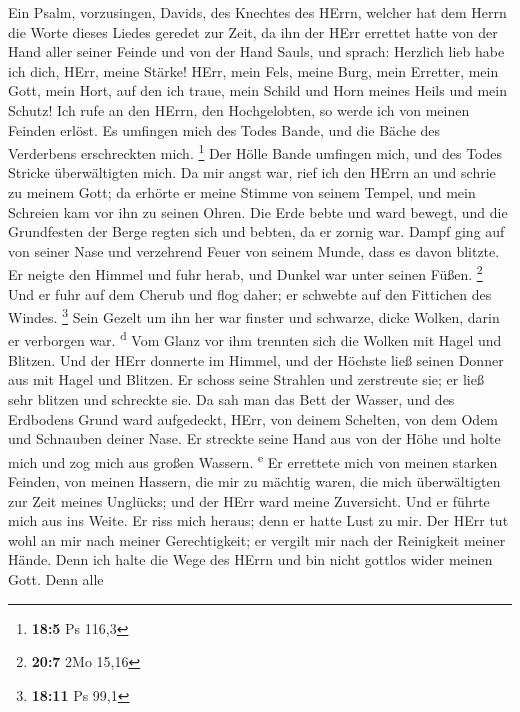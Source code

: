  Ein Psalm, vorzusingen, Davids, des Knechtes des HErrn,
welcher hat dem Herrn die Worte dieses Liedes geredet zur Zeit, da ihn
der HErr errettet hatte von der Hand aller seiner Feinde und von der
Hand Sauls,  und sprach: Herzlich lieb habe ich dich,
HErr, meine Stärke!  HErr, mein Fels, meine Burg, mein
Erretter, mein Gott, mein Hort, auf den ich traue, mein Schild und Horn
meines Heils und mein Schutz!  Ich rufe an den HErrn, den
Hochgelobten, so werde ich von meinen Feinden erlöst.  Es
umfingen mich des Todes Bande, und die Bäche des Verderbens erschreckten
mich. \footnote{\textbf{18:5} Ps 116,3}  Der Hölle Bande
umfingen mich, und des Todes Stricke überwältigten mich. 
Da mir angst war, rief ich den HErrn an und schrie zu meinem Gott; da
erhörte er meine Stimme von seinem Tempel, und mein Schreien kam vor ihn
zu seinen Ohren.  Die Erde bebte und ward bewegt, und die
Grundfesten der Berge regten sich und bebten, da er zornig war.
 Dampf ging auf von seiner Nase und verzehrend Feuer von
seinem Munde, dass es davon blitzte.  Er neigte den
Himmel und fuhr herab, und Dunkel war unter seinen Füßen. \footnote{\textbf{20:7}
  2Mo 15,16}  Und er fuhr auf dem Cherub und flog daher;
er schwebte auf den Fittichen des Windes. \footnote{\textbf{18:11} Ps
  99,1}  Sein Gezelt um ihn her war finster und schwarze,
dicke Wolken, darin er verborgen war. \textsuperscript{d}
 Vom Glanz vor ihm trennten sich die Wolken mit Hagel und
Blitzen.  Und der HErr donnerte im Himmel, und der
Höchste ließ seinen Donner aus mit Hagel und Blitzen.  Er
schoss seine Strahlen und zerstreute sie; er ließ sehr blitzen und
schreckte sie.  Da sah man das Bett der Wasser, und des
Erdbodens Grund ward aufgedeckt, HErr, von deinem Schelten, von dem Odem
und Schnauben deiner Nase.  Er streckte seine Hand aus
von der Höhe und holte mich und zog mich aus großen Wassern.
\textsuperscript{e}  Er errettete mich von meinen starken
Feinden, von meinen Hassern, die mir zu mächtig waren, 
die mich überwältigten zur Zeit meines Unglücks; und der HErr ward meine
Zuversicht.  Und er führte mich aus ins Weite. Er riss
mich heraus; denn er hatte Lust zu mir.  Der HErr tut
wohl an mir nach meiner Gerechtigkeit; er vergilt mir nach der
Reinigkeit meiner Hände.  Denn ich halte die Wege des
HErrn und bin nicht gottlos wider meinen Gott.  Denn alle
